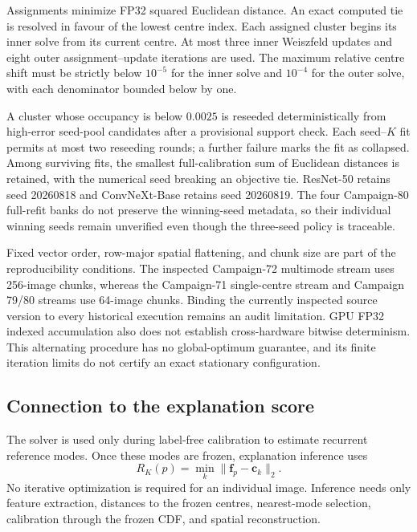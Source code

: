 Assignments minimize FP32 squared Euclidean distance. An exact computed tie is
resolved in favour of the lowest centre index. Each assigned cluster begins its
inner solve from its current centre. At most three inner Weiszfeld updates and
eight outer assignment--update iterations are used. The maximum relative
centre shift must be strictly below $10^{-5}$ for the inner solve and
$10^{-4}$ for the outer solve, with each denominator bounded below by one.

A cluster whose occupancy is below $0.0025$ is reseeded deterministically from
high-error seed-pool candidates after a provisional support check. Each
seed--$K$ fit permits at most two reseeding rounds; a further failure marks the
fit as collapsed. Among surviving fits, the smallest full-calibration sum of
Euclidean distances is retained, with the numerical seed breaking an objective
tie. ResNet-50 retains seed 20260818 and ConvNeXt-Base retains seed 20260819.
The four Campaign-80 full-refit banks do not preserve the winning-seed metadata,
so their individual winning seeds remain unverified even though the three-seed
policy is traceable.

Fixed vector order, row-major spatial flattening, and chunk size are part of the
reproducibility conditions. The inspected Campaign-72 multimode stream uses
256-image chunks, whereas the Campaign-71 single-centre stream and Campaign
79/80 streams use 64-image chunks. Binding the currently inspected source
version to every historical execution remains an audit limitation. GPU FP32
indexed accumulation also does not establish cross-hardware bitwise
determinism. This alternating procedure has no global-optimum guarantee, and
its finite iteration limits do not certify an exact stationary configuration.

\subsection{Connection to the explanation score}

The solver is used only during label-free calibration to estimate recurrent
reference modes. Once these modes are frozen, explanation inference uses
\begin{equation}
    R_K(p)=\min_k\|\bm f_p-\bm c_k\|_2.
\end{equation}
No iterative optimization is required for an individual image. Inference needs
only feature extraction, distances to the frozen centres, nearest-mode
selection, calibration through the frozen CDF, and spatial reconstruction.
